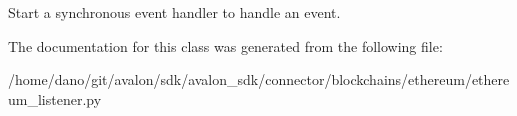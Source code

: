 \begin{DoxyVerb}Start a synchronous event handler to handle an event.\end{DoxyVerb}
 

The documentation for this class was generated from the following file\+:\begin{DoxyCompactItemize}
\item 
/home/dano/git/avalon/sdk/avalon\+\_\+sdk/connector/blockchains/ethereum/ethereum\+\_\+listener.\+py\end{DoxyCompactItemize}
